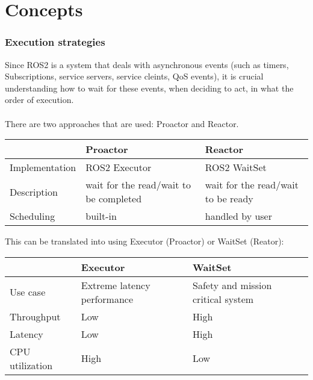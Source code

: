 


\part{Concepts}


\section*{Execution strategies}
  Since ROS2 is a system that deals with asynchronous events (such as timers, Subscriptions, service servers, service cleints, QoS events), it is crucial understanding how to wait for these events, when deciding to act, in what the order of execution. 
  \\
  \\
  There are two approaches that are used: Proactor and Reactor.

  \begin{table}[htbp]
    \centering
    \begin{tabularx}{\textwidth}[t]{|l|X|X|}
      \hline
      & \centering Proactor & \centering\arraybackslash Reactor \\
      \hline
      Implementation  & ROS2 Executor & ROS2 WaitSet \\
      \hline
      Description     & wait for the read/wait to be completed & wait for the read/wait to be ready \\
      \hline
      Scheduling      & built-in & handled by user \\
      \hline
    \end{tabularx}
  \end{table}

  This can be translated into using Executor (Proactor) or WaitSet (Reator):

  \begin{table}[htbp]
    \centering
    \begin{tabularx}{\textwidth}[t]{|l|X|X|}
      \hline
      & \centering Executor & \centering\arraybackslash WaitSet \\
      \hline
      Use case & Extreme latency performance & Safety and mission critical system \\
      \hline
      Throughput & Low & High \\
      \hline
      Latency & Low & High \\
      \hline
      CPU utilization & High & Low \\
      \hline
    \end{tabularx}
  \end{table}




